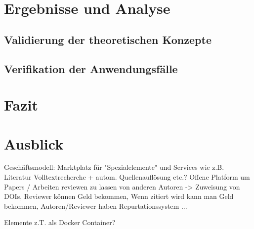 \chapter{Ergebnisse und Analyse}

\section{Validierung der theoretischen Konzepte}

\section{Verifikation der Anwendungsfälle}


\chapter{Fazit}


\chapter{Ausblick}

Geschäftsmodell: Marktplatz für "Spezialelemente" und Services wie z.B. Literatur Volltextrecherche + autom. Quellenauflösung etc.? Offene Platform um Papers / Arbeiten reviewen zu lassen von anderen Autoren -> Zuweisung von DOIs, Reviewer können Geld bekommen, Wenn zitiert wird kann man Geld bekommen, Autoren/Reviewer haben Repurtationssystem ...

Elemente z.T. als Docker Container?


